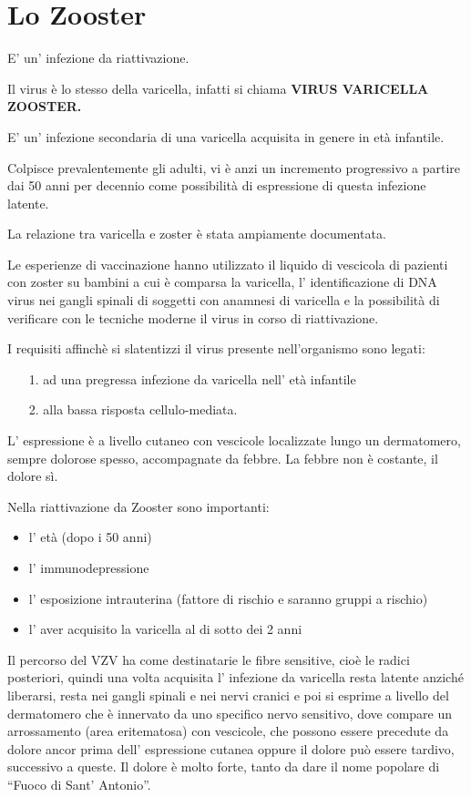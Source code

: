 \section{Lo Zooster}

E' un' infezione da riattivazione.

Il virus è lo stesso della varicella, infatti si chiama \textbf{VIRUS
VARICELLA ZOOSTER.}

E' un' infezione secondaria di una varicella acquisita in genere in età
infantile.

Colpisce prevalentemente gli adulti, vi è anzi un incremento progressivo
a partire dai 50 anni per decennio come possibilità di espressione di
questa infezione latente.

La relazione tra varicella e zoster è stata ampiamente documentata.

Le esperienze di vaccinazione hanno utilizzato il liquido di vescicola
di pazienti con zoster su bambini a cui è comparsa la varicella, l'
identificazione di DNA virus nei gangli spinali di soggetti con anamnesi
di varicella e la possibilità di verificare con le tecniche moderne il
virus in corso di riattivazione.

I requisiti affinchè si slatentizzi il virus presente nell'organismo
sono legati:

\begin{itemize}
\item[1.]
  ad una pregressa infezione da varicella nell' età infantile
\item[2.]
  alla bassa risposta cellulo-mediata.
\end{itemize}
  L' espressione è a livello cutaneo con vescicole localizzate lungo un
  dermatomero, sempre dolorose spesso, accompagnate da febbre. La febbre
  non è costante, il dolore sì.

  Nella riattivazione da Zooster sono importanti:

\begin{itemize}
\item
  l' età (dopo i 50 anni)
\item
  l' immunodepressione
\item
  l' esposizione intrauterina (fattore di rischio e saranno gruppi a
  rischio)
\item
  l' aver acquisito la varicella al di sotto dei 2 anni
\end{itemize}
  Il percorso del VZV ha come destinatarie le fibre sensitive, cioè le
  radici posteriori, quindi una volta acquisita l' infezione da
  varicella resta latente anziché liberarsi, resta nei gangli spinali e
  nei nervi cranici e poi si esprime a livello del dermatomero che è
  innervato da uno specifico nervo sensitivo, dove compare un
  arrossamento (area eritematosa) con vescicole, che possono essere
  precedute da dolore ancor prima dell' espressione cutanea oppure il
  dolore può essere tardivo, successivo a queste. Il dolore è molto
  forte, tanto da dare il nome popolare di ``Fuoco di Sant' Antonio''.

